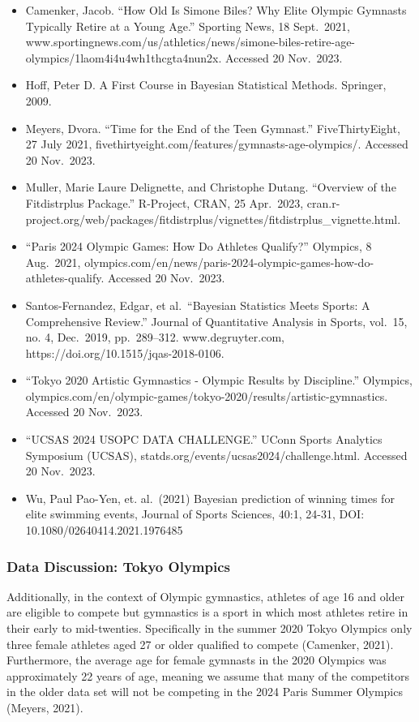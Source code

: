 \documentclass[
  10.5pt,
  letterpaper,
  DIV=11,
  numbers=noendperiod]{scrartcl}
\begin{document}
\begin{itemize}
\item
  Camenker, Jacob. ``How Old Is Simone Biles? Why Elite Olympic Gymnasts
  Typically Retire at a Young Age.'' Sporting News, 18 Sept.~2021,
  www.sportingnews.com/us/athletics/news/simone-biles-retire-age-olympics/1laom4i4u4wh1thcgta4nun2x.
  Accessed 20 Nov.~2023.
\item
  Hoff, Peter D. A First Course in Bayesian Statistical Methods.
  Springer, 2009.
\item
  Meyers, Dvora. ``Time for the End of the Teen Gymnast.''
  FiveThirtyEight, 27 July 2021,
  fivethirtyeight.com/features/gymnasts-age-olympics/. Accessed 20
  Nov.~2023.
\item
  Muller, Marie Laure Delignette, and Christophe Dutang. ``Overview of
  the Fitdistrplus Package.'' R-Project, CRAN, 25 Apr.~2023,
  cran.r-project.org/web/packages/fitdistrplus/vignettes/fitdistrplus\_vignette.html.
\item
  ``Paris 2024 Olympic Games: How Do Athletes Qualify?'' Olympics, 8
  Aug.~2021,
  olympics.com/en/news/paris-2024-olympic-games-how-do-athletes-qualify.
  Accessed 20 Nov.~2023.
\item
  Santos-Fernandez, Edgar, et al.~``Bayesian Statistics Meets Sports: A
  Comprehensive Review.'' Journal of Quantitative Analysis in Sports,
  vol.~15, no. 4, Dec.~2019, pp.~289--312. www.degruyter.com,
  https://doi.org/10.1515/jqas-2018-0106.
\item
  ``Tokyo 2020 Artistic Gymnastics - Olympic Results by Discipline.''
  Olympics,
  olympics.com/en/olympic-games/tokyo-2020/results/artistic-gymnastics.
  Accessed 20 Nov.~2023.
\item
  ``UCSAS 2024 USOPC DATA CHALLENGE.'' UConn Sports Analytics Symposium
  (UCSAS), statds.org/events/ucsas2024/challenge.html. Accessed 20
  Nov.~2023.
\item
  Wu, Paul Pao-Yen, et. al.~(2021) Bayesian prediction of winning times
  for elite swimming events, Journal of Sports Sciences, 40:1, 24-31,
  DOI: 10.1080/02640414.2021.1976485
\end{itemize}

\hypertarget{data-discussion-tokyo-olympics}{%
\subsubsection{Data Discussion: Tokyo
Olympics}\label{data-discussion-tokyo-olympics}}

Additionally, in the context of Olympic gymnastics, athletes of age 16
and older are eligible to compete but gymnastics is a sport in which
most athletes retire in their early to mid-twenties. Specifically in the
summer 2020 Tokyo Olympics only three female athletes aged 27 or older
qualified to compete (Camenker, 2021). Furthermore, the average age for
female gymnasts in the 2020 Olympics was approximately 22 years of age,
meaning we assume that many of the competitors in the older data set
will not be competing in the 2024 Paris Summer Olympics (Meyers, 2021).
\end{document}

